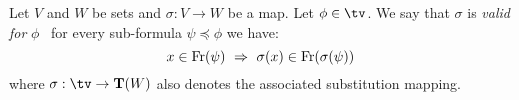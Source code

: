 \begin{defin}\label{logic:def:LAM:valid:substitution}
    Let $V$ and $W$ be sets and $\sigma:V\to W$ be a map. Let
    $\phi\in\tv$. We say that $\sigma$ is {\em valid for} $\phi$ \ifand\
    for every sub-formula $\psi\preceq\phi$ we have:
    \[
        x\in\free(\psi)\ \Rightarrow\ \sigma(x)\in\free(\sigma(\psi))
    \]
    where $\sigma:\tv\to{\bf T}(W)$ also denotes the associated substitution 
    mapping.
\end{defin}

